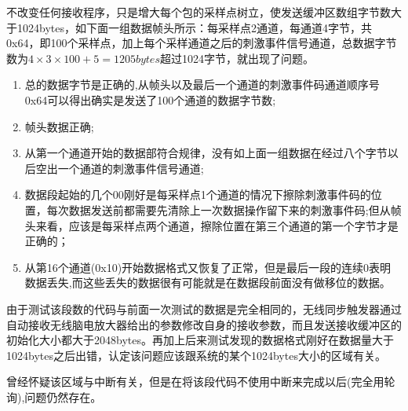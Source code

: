 不改变任何接收程序，只是增大每个包的采样点树立，使发送缓冲区数组字节数大于1024bytes，如下面一组数据帧头所示：每采样点2通道，每通道4字节，共0x64，即100个采样点，加上每个采样通道之后的刺激事件信号通道，总数据字节数为$4 \times 3 \times 100 + 5 = 1205 bytes$超过1024字节，就出现了问题。
\begin{enumerate}
\item 总的数据字节是正确的,从帧头以及最后一个通道的刺激事件码通道顺序号0x64可以得出确实是发送了100个通道的数据字节数;
\item 帧头数据正确;
\item 从第一个通道开始的数据部符合规律，没有如上面一组数据在经过八个字节以后空出一个通道的刺激事件信号通道;
\item 数据段起始的几个00刚好是每采样点1个通道的情况下擦除刺激事件码的位置，每次数据发送前都需要先清除上一次数据操作留下来的刺激事件码;但从帧头来看，应该是每采样点两个通道，擦除位置在第三个通道的第一个字节才是正确的；
\item 从第16个通道(0x10)开始数据格式又恢复了正常，但是最后一段的连续0表明数据丢失,而这些丢失的数据很有可能就是在数据段前面没有做移位的数据。
\end{enumerate}

由于测试该段数的代码与前面一次测试的数据是完全相同的，无线同步触发器通过自动接收无线脑电放大器给出的参数修改自身的接收参数，而且发送接收缓冲区的初始化大小都大于2048bytes。再加上后来测试发现的数据格式刚好在数据量大于1024bytes之后出错，认定该问题应该跟系统的某个1024bytes大小的区域有关。

曾经怀疑该区域与中断有关，但是在将该段代码不使用中断来完成以后(完全用轮询),问题仍然存在。

